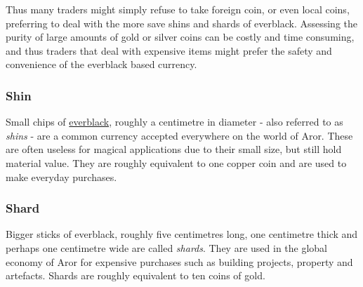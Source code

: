Thus many traders might simply refuse to take foreign coin, or even local
coins, preferring to deal with the more save shins and shards of everblack.
Assessing the purity of large amounts of gold or silver coins can be costly
and time consuming, and thus traders that deal with expensive items might
prefer the safety and convenience of the everblack based currency.

\subsubsection{Shin}
\label{sec:Shin}

Small chips of \hyperref[sec:Everblack]{everblack}, roughly a centimetre in
diameter - also referred to as \emph{shins} - are a common currency accepted
everywhere on the world of Aror. These are often useless for magical
applications due to their small size, but still hold material value. They are
roughly equivalent to one copper coin and are used to make everyday purchases.

\subsubsection{Shard}
\label{sec:Shard}

Bigger sticks of everblack, roughly five centimetres long, one centimetre thick
and perhaps one centimetre wide are called \emph{shards}. They are used in the
global economy of Aror for expensive purchases such as building projects,
property and artefacts. Shards are roughly equivalent to ten coins of gold.

